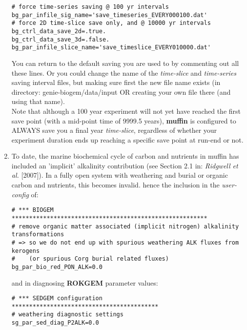 \begin{enumerate}[noitemsep]
\vspace{-1mm}\small\begin{verbatim}
# force time-series saving @ 100 yr intervals
bg_par_infile_sig_name='save_timeseries_EVERY000100.dat'
# force 2D time-slice save only, and @ 10000 yr intervals
bg_ctrl_data_save_2d=.true.
bg_ctrl_data_save_3d=.false.
bg_par_infile_slice_name='save_timeslice_EVERY010000.dat'
\end{verbatim}\normalsize\vspace{-1mm}
You can return to the default saving you are used to by commenting out all these lines. Or you could change the name of the \textit{time-slice} and \textit{time-series} saving interval files, but making sure first the new file name exists (in directory: \textsf{\footnotesize genie-biogem/data/input} OR creating your own file there (and using that name).
\\Note that although a 100 year experiment will not yet have reached the first save point (with a mid-point time of 9999.5 years), \textbf{muffin} is configured to ALWAYS save you a final year \textit{time-slice}, regardless of whether your experiment duration ends up reaching a specific save point at run-end or not.
\vspace{1mm}
\item To date, the marine biochemical cycle of carbon and nutrients in muffin has included an 'implicit' alkalinity contribution (see Section 2.1 in: \textit{Ridgwell et al.} [2007]). In a fully open system with weathering and burial or organic carbon and nutrients, this becomes invalid. hence the inclusion in the \textit{user-config} of:
\vspace{-1mm}\small\begin{verbatim}
# *** BIOGEM ********************************************************
# remove organic matter associated (implicit nitrogen) alkalinity transformations
# => so we do not end up with spurious weathering ALK fluxes from kerogens 
#    (or spurious Corg burial related fluxes)
bg_par_bio_red_PON_ALK=0.0
\end{verbatim}\normalsize\vspace{-1mm}
\newpage
and in diagnosing \textbf{ROKGEM} parameter values:
\vspace{-1mm}\small\begin{verbatim}
# *** SEDGEM configuration ******************************************
# weathering diagnostic settings    
sg_par_sed_diag_P2ALK=0.0

\end{verbatim}
\end{enumerate}
